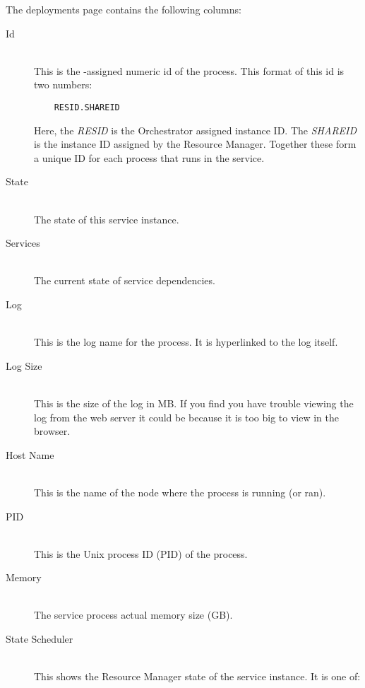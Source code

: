    The deployments page contains the following columns:
   \begin{description}
      \item[Id] \hfill \\
        This is the {\DUCC}-assigned numeric id of the process.  This format of this
        id is two numbers:
\begin{verbatim}
    RESID.SHAREID
\end{verbatim}
        Here, the {\em RESID} is the Orchestrator assigned instance ID.  The {\em SHAREID} is the 
        instance ID assigned by the Resource Manager.  Together these form a unique
        ID for each process that runs in the service.
               
      \item[State] \hfill \\
        The state of this service instance.
               
      \item[Services] \hfill \\
        The current state of service dependencies.
                                
      \item[Log] \hfill \\
        This is the log name for the process. It is hyperlinked to the log itself.
        
      \item[Log Size] \hfill \\
        This is the size of the log in MB. If you find you have trouble viewing the log
        from the web server it could be because it is too big to view in the browser.
        
      \item[Host Name] \hfill \\
        This is the name of the node where the process is running (or ran).
        
      \item[PID] \hfill \\
        This is the Unix process ID (PID) of the process.
       
      \item[Memory] \hfill \\
        The service process actual memory size (GB).
                
      \item[State Scheduler] \hfill \\
        This shows the Resource Manager state of the service instance. It is one of:
        

\end{description}
